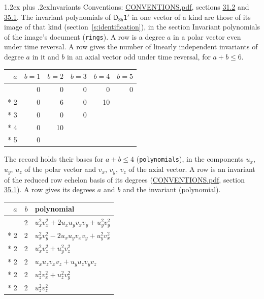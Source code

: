 \documentclass[10pt,a4paper]{article}
\makeatletter
\renewcommand\section{\@startsection{section}{1}{\z@}{-3ex plus -1ex minus -.2ex}%
  {1.2ex plus .2ex}{\normalfont\large\sffamily\bfseries\color{parttitle}}}
\numberwithin{equation}{section}
\newcommand{\grp}[1]{\mathsf{#1}}
\makeatother
\begin{document}
\section{Invariants}\label{s:invariants}
Conventions: \href{../../CONVENTIONS.pdf}{CONVENTIONS.pdf}, sections \href{../../CONVENTIONS.pdf\#conv.31.2}{31.2} and \href{../../CONVENTIONS.pdf\#conv.35.1}{35.1}.
The invariant polynomials of $\grp{D_{8h}1'}$ in one vector of a kind are those of its image of that kind (section~\ref{s:identification}), in the section Invariant polynomials of the image's document (\texttt{rings}).
\leavevmode\label{n:index.degree.polar}\label{n:index.degree.axial}A row is a degree $a$ in a polar vector even under time reversal. A row gives the number of linearly independent invariants of degree $a$ in it and $b$ in an axial vector odd under time reversal, for $a + b \le 6$.
{\small\begin{longtable}{@{}rrrrrr@{}}\toprule
$a$ & $b = 1$ & $b = 2$ & $b = 3$ & $b = 4$ & $b = 5$\\\midrule\endhead
\bottomrule\endfoot\endlastfoot
1 & 0 & 0 & 0 & 0 & 0\\*
2 & 0 & 6 & 0 & 10 & \\*
3 & 0 & 0 & 0 &  & \\*
4 & 0 & 10 &  &  & \\*
5 & 0 &  &  &  & \\
\bottomrule\end{longtable}}
\leavevmode\label{n:local.component.polar}\label{n:local.component.axial}The record holds their bases for $a + b \le 4$ (\texttt{polynomials}), in the components $u_{x}$, $u_{y}$, $u_{z}$ of the polar vector and $v_{x}$, $v_{y}$, $v_{z}$ of the axial vector. \label{n:head.polynomial}A row is an invariant of the reduced row echelon basis of its degrees (\href{../../CONVENTIONS.pdf}{CONVENTIONS.pdf}, section \href{../../CONVENTIONS.pdf\#conv.35.1}{35.1}). A row gives its degrees $a$ and $b$ and the invariant (polynomial).
{\small\renewcommand{\arraystretch}{1.2}\begin{longtable}{@{}rrl@{}}\toprule
$a$ & $b$ & polynomial\\\midrule\endhead
\bottomrule\endfoot\endlastfoot
2 & 2 & $u_{x}^{2}v_{x}^{2} + 2u_{x}u_{y}v_{x}v_{y} + u_{y}^{2}v_{y}^{2}$\\*
2 & 2 & $u_{x}^{2}v_{y}^{2} - 2u_{x}u_{y}v_{x}v_{y} + u_{y}^{2}v_{x}^{2}$\\*
2 & 2 & $u_{x}^{2}v_{z}^{2} + u_{y}^{2}v_{z}^{2}$\\*
2 & 2 & $u_{x}u_{z}v_{x}v_{z} + u_{y}u_{z}v_{y}v_{z}$\\*
2 & 2 & $u_{z}^{2}v_{x}^{2} + u_{z}^{2}v_{y}^{2}$\\*
2 & 2 & $u_{z}^{2}v_{z}^{2}$\\
\bottomrule\end{longtable}}
\end{document}
